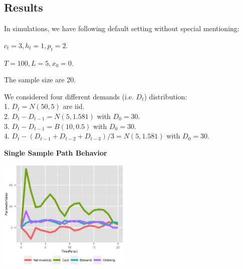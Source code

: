 \documentclass[twoside]{article}
\begin{document}
\begin{multicols}{2}
\section{Results}

In simulations, we have following default setting without special mentioning:
\begin{compactitem}
      \item $c_t = 3, h_t = 1, p_t = 2$.
      \item $T = 100, L = 5, x_0 = 0$.
      \item The sample size are 20.
      \item We considered four different demands (i.e. $D_t$) distribution:\\
            1. $D_t = N(50,5)$ are iid.\\
            2. $D_t-D_{t-1} = N(5,1.581)$ with $D_0=30$.\\
            3. $D_t-D_{t-1} = B(10,0.5)$ with $D_0=30$.\\
            4. $D_t- (D_{t-1} + D_{t-2} + D_{t-3})/3 = N(5,1.581)$ with $D_0=30$.
\end{compactitem}
\begin{center}
  \textbf{Single Sample Path Behavior}
\end{center}
\begin{center}
  \label{figure:DualBalancingParameters}
  \includegraphics[width=2.5in]{figures/DualBalancingParameters.png}
\end{center}


\end{multicols}
\end{document}

